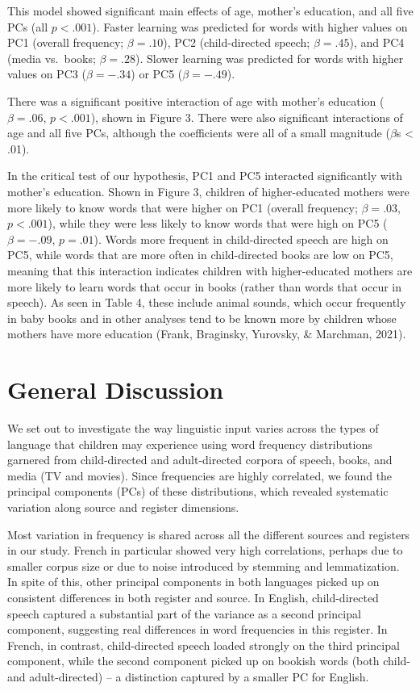 \documentclass[10pt, letterpaper]{article}
\begin{document}
This model showed significant main effects of age, mother's education,
and all five PCs (all \(p<.001\)). Faster learning was predicted for
words with higher values on PC1 (overall frequency; \(\beta=.10\)), PC2
(child-directed speech; \(\beta=.45\)), and PC4 (media vs.~books;
\(\beta=.28\)). Slower learning was predicted for words with higher
values on PC3 (\(\beta=-.34\)) or PC5 (\(\beta=-.49\)).

There was a significant positive interaction of age with mother's
education (\(\beta=.06\), \(p<.001\)), shown in Figure 3. There were
also significant interactions of age and all five PCs, although the
coefficients were all of a small magnitude (\(\beta\)s \textless{} .01).

In the critical test of our hypothesis, PC1 and PC5 interacted
significantly with mother's education. Shown in Figure 3, children of
higher-educated mothers were more likely to know words that were higher
on PC1 (overall frequency; \(\beta = .03\), \(p<.001\)), while they were
less likely to know words that were high on PC5 (\(\beta = -.09\),
\(p=.01\)). Words more frequent in child-directed speech are high on
PC5, while words that are more often in child-directed books are low on
PC5, meaning that this interaction indicates children with
higher-educated mothers are more likely to learn words that occur in
books (rather than words that occur in speech). As seen in Table 4,
these include animal sounds, which occur frequently in baby books and in
other analyses tend to be known more by children whose mothers have more
education (Frank, Braginsky, Yurovsky, \& Marchman, 2021).

\hypertarget{general-discussion}{%
\section{General Discussion}\label{general-discussion}}

We set out to investigate the way linguistic input varies across the
types of language that children may experience using word frequency
distributions garnered from child-directed and adult-directed corpora of
speech, books, and media (TV and movies). Since frequencies are highly
correlated, we found the principal components (PCs) of these
distributions, which revealed systematic variation along source and
register dimensions.

Most variation in frequency is shared across all the different sources
and registers in our study. French in particular showed very high
correlations, perhaps due to smaller corpus size or due to noise
introduced by stemming and lemmatization. In spite of this, other
principal components in both languages picked up on consistent
differences in both register and source. In English, child-directed
speech captured a substantial part of the variance as a second principal
component, suggesting real differences in word frequencies in this
register. In French, in contrast, child-directed speech loaded strongly
on the third principal component, while the second component picked up
on bookish words (both child- and adult-directed) -- a distinction
captured by a smaller PC for English.
\end{document}
